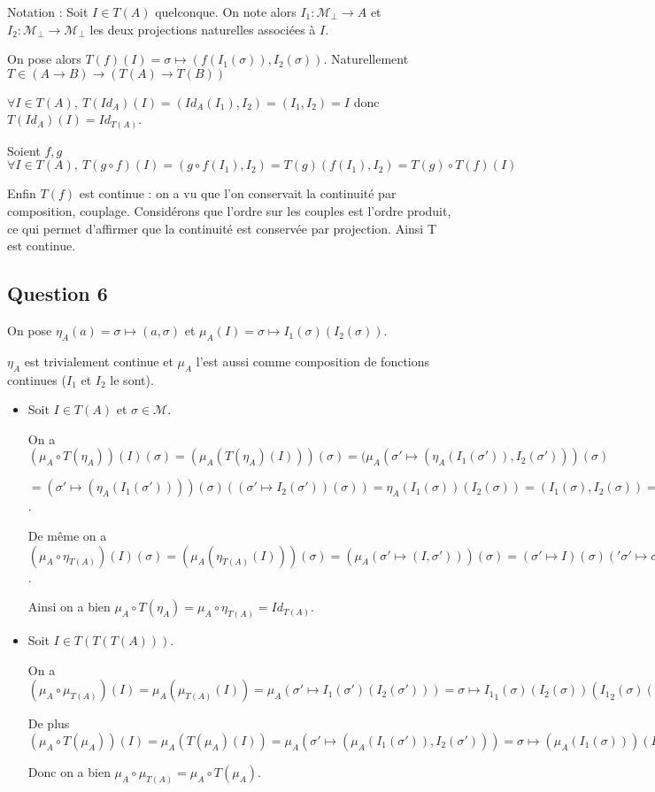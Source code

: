 \documentclass{article}
\newcommand{\M}{\mathcal{M}}
\begin{document}
Notation : Soit $I \in T(A)$ quelconque. On note alors $I_1 : \M_\bot \rightarrow A$ et $I_2 : \M_\bot \rightarrow \M_\bot$ les deux projections naturelles associées à $I$.

On pose alors $T(f)(I) = \sigma \mapsto (f(I_1(\sigma)), I_2(\sigma))$. Naturellement $T\in (A \rightarrow B) \rightarrow (T(A)\rightarrow T(B))$

$\forall I\in T(A), \ T(Id_A)(I)=(Id_A(I_1),I_2)=(I_1,I_2)=I$ donc $T(Id_A)(I)=Id_{T(A)}$.

Soient $f,g$ $\forall I\in T(A),\ T(g\circ f)(I)=(g\circ f(I_1),I_2)=T(g)(f(I_1),I_2)=T(g)\circ T(f)(I)$

Enfin $T(f)$ est continue : on a vu que l'on conservait la continuité par composition, couplage. Considérons que l'ordre sur les couples est l'ordre produit, ce qui permet d'affirmer que la continuité est conservée par projection. Ainsi T est continue.


\subsection*{Question 6}

On pose $\eta_A(a) = \sigma \mapsto (a, \sigma)$ et $\mu_A(I) = \sigma \mapsto I_1(\sigma)(I_2(\sigma))$. 

$\eta_A$ est trivialement continue et $\mu_A$ l'est aussi comme composition de fonctions continues ($I_1$ et $I_2$ le sont).

\begin{itemize}
\item Soit $I \in T(A)$ et $\sigma \in \M$.

  On a $(\mu_A \circ T(\eta_A))(I)(\sigma) = (\mu_A(T(\eta_A)(I)))(\sigma) = (\mu_A(\sigma' \mapsto (\eta_A(I_1(\sigma')), I_2(\sigma')))(\sigma)$
  
   $ = (\sigma' \mapsto (\eta_A(I_1(\sigma'))))(\sigma)((\sigma' \mapsto I_2(\sigma'))(\sigma)) = \eta_A (I_1(\sigma))(I_2(\sigma)) = (I_1(\sigma), I_2(\sigma)) = I(\sigma)$.

De même on a $(\mu_A \circ \eta_{T(A)})(I)(\sigma) = (\mu_A(\eta_{T(A)}(I)))(\sigma) = (\mu_A(\sigma' \mapsto (I, \sigma')))(\sigma) = (\sigma' \mapsto I)(\sigma)('\sigma' \mapsto \sigma')(\sigma)) = I(\sigma)$.

Ainsi on a bien $\mu_A \circ T(\eta_A) = \mu_A \circ \eta_{T(A)} = Id_{T(A)}$.

\item Soit $I \in T(T(T(A)))$.

 On a $(\mu_A \circ \mu_{T(A)})(I) = \mu_A(\mu_{T(A)}(I)) = \mu_A(\sigma' \mapsto I_1(\sigma')(I_2(\sigma'))) = \sigma \mapsto {I_1}_1(\sigma)(I_2(\sigma))({I_1}_2(\sigma)(I_2(\sigma)))$

De plus $(\mu_A \circ T(\mu_A))(I) = \mu_A(T(\mu_A)(I)) = \mu_A(\sigma' \mapsto (\mu_A(I_1(\sigma')), I_2(\sigma'))) = \sigma \mapsto (\mu_A(I_1(\sigma)))(I_2(\sigma)) = \sigma \mapsto (\sigma' \mapsto {I_1}_1(\sigma)(\sigma')({I_1}_2(\sigma)(\sigma')))(I_2(\sigma)) = \sigma \mapsto {I_1}_1(\sigma)(I_2(\sigma))({I_1}_2(\sigma)(I_2(\sigma))))$
 
 Donc on a bien $\mu_A \circ \mu_{T(A)} = \mu_A \circ T(\mu_A)$.
 
 \end{itemize}
\end{document}

